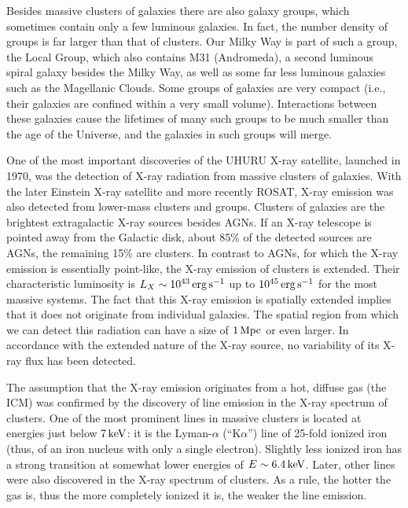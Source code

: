 \documentclass[a4paper,11pt]{article}
\begin{document}
{\noindent}Besides massive clusters of galaxies there are also galaxy groups, which sometimes contain only a few luminous galaxies. In fact, the number density of groups is far larger than that of clusters. Our Milky Way is part of such a group, the Local Group, which also contains M31 (Andromeda), a second luminous spiral galaxy besides the Milky Way, as well as some far less luminous galaxies such as the Magellanic Clouds. Some groups of galaxies are very compact (i.e., their galaxies are confined within a very small volume). Interactions between these galaxies cause the lifetimes of many such groups to be much smaller than the age of the Universe, and the galaxies in such groups will merge.

{\noindent}One of the most important discoveries of the UHURU X-ray satellite, launched in 1970, was the detection of X-ray radiation from massive clusters of galaxies. With the later Einstein X-ray satellite and more recently ROSAT, X-ray emission was also detected from lower-mass clusters and groups. Clusters of galaxies are the brightest extragalactic X-ray sources besides AGNs. If an X-ray telescope is pointed away from the Galactic disk, about 85\% of the detected sources are AGNs, the remaining 15\% are clusters. In contrast to AGNs, for which the X-ray emission is essentially point-like, the X-ray emission of clusters is extended. Their characteristic luminosity is $L_X\sim10^{43}\,{\rm erg\,s^{-1}}$ up to $10^{45}\,{\rm erg\,s^{-1}}$ for the most massive systems. The fact that this X-ray emission is spatially extended implies that it does not originate from individual galaxies. The spatial region from which we can detect this radiation can have a size of $1\,{\rm Mpc}$ or even larger. In accordance with the extended nature of the X-ray source, no variability of its X-ray flux has been detected.

{\noindent}The assumption that the X-ray emission originates from a hot, diffuse gas (the ICM) was confirmed by the discovery of line emission in the X-ray spectrum of clusters. One of the most prominent lines in massive clusters is located at energies just below $7\,{\rm keV}$: it is the Lyman-$\alpha$ (``K$\alpha$'') line of 25-fold ionized iron (thus, of an iron nucleus with only a single electron). Slightly less ionized iron has a strong transition at somewhat lower energies of $E\sim6.4\,{\rm keV}$. Later, other lines were also discovered in the X-ray spectrum of clusters. As a rule, the hotter the gas is, thus the more completely ionized it is, the weaker the line emission. 
\end{document}
